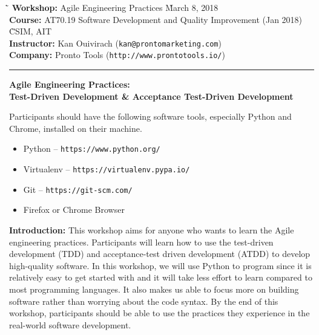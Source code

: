 \documentclass{article}
\begin{document}
\begin{tabbing}
  \`\=\kill
  \textbf{Workshop:} Agile Engineering Practices
  \` March 8, 2018 \\
  \textbf{Course:} AT70.19 Software Development and Quality Improvement (Jan
  2018) \` CSIM, AIT \\
  \textbf{Instructor:} Kan Ouivirach ({\tt \small kan@prontomarketing.com}) \\
  \textbf{Company:} Pronto Tools ({\tt \small http://www.prontotools.io/})
\end{tabbing}

\hrule

\vspace{.25in}

\begin{center}
  \textbf{\Large Agile Engineering Practices:} \\
  \vspace{.1in}
  \textbf{\large Test-Driven Development \& Acceptance Test-Driven Development}
\end{center}

\vspace{.15in}

 Participants should have the following software
tools, especially Python and Chrome, installed on their machine.

\begin{itemize}
  \item Python -- {\tt https://www.python.org/}
  \item Virtualenv -- {\tt https://virtualenv.pypa.io/}
  \item Git -- {\tt https://git-scm.com/}
  \item Firefox or Chrome Browser
\end{itemize}

\noindent \textbf{Introduction:} This workshop aims for anyone who wants to
learn the Agile engineering practices. Participants will learn how to use the
test-driven development (TDD) and acceptance-test driven development (ATDD) to
develop high-quality software. In this workshop, we will use Python to program
since it is relatively easy to get started with and it will take less effort to
learn compared to most programming languages. It also makes us able to focus
more on building software rather than worrying about the code syntax. By the
end of this workshop, participants should be able to use the practices they
experience in the real-world software development. \\
\end{document}
